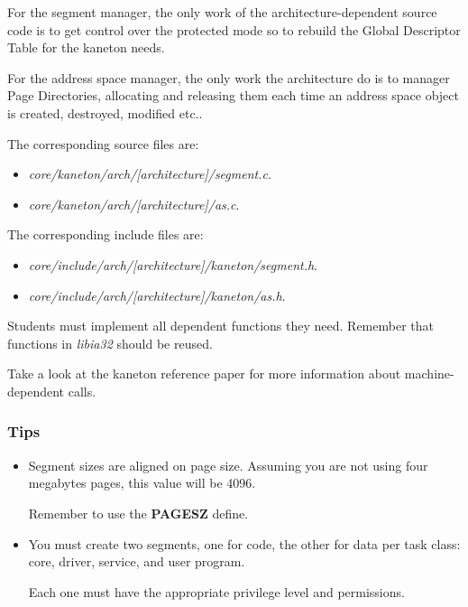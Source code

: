 For the segment manager, the only work of the architecture-dependent source
code is to get control over the protected mode so to rebuild the Global
Descriptor Table for the kaneton needs.

For the address space manager, the only work the architecture do is to
manager Page Directories, allocating and releasing them each time an
address space object is created, destroyed, modified etc..

The corresponding source files are:

\begin{itemize}
  \item
    \textit{core/kaneton/arch/[architecture]/segment.c}.
  \item
    \textit{core/kaneton/arch/[architecture]/as.c}.
\end{itemize}

The corresponding include files are:

\begin{itemize}
  \item
    \textit{core/include/arch/[architecture]/kaneton/segment.h}.
  \item
    \textit{core/include/arch/[architecture]/kaneton/as.h}.
\end{itemize}

Students must implement all dependent functions they need. Remember that
functions in \textit{libia32} should be reused.

Take a look at the kaneton reference paper for more information about
machine-dependent calls.

\subsubsection{Tips}

\begin{itemize}
  \item
    Segment sizes are aligned on page size. Assuming you are not using
    four megabytes pages, this value will be 4096.

    Remember to use the \textbf{PAGESZ} define.
  \item
    You must create two segments, one for code, the other for data
    per task class: core, driver, service, and user program.

    Each one must have the appropriate privilege level and permissions.
\end{itemize}

%
%

